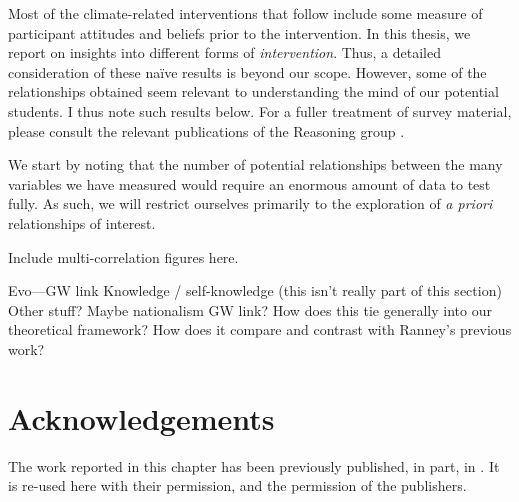 Most of the climate-related interventions that follow include some measure of
participant attitudes and beliefs prior to the intervention. In this thesis, we
report on insights into different forms of \emph{intervention}. Thus, a detailed
consideration of these na\"ive
results is beyond our scope. However, some of the relationships obtained seem
relevant to understanding the mind of our potential students. I thus note such
results below. For a fuller treatment of survey material, please consult the
relevant publications of the Reasoning group
\cite[notably,][]{cohen-thesis,ranney-etal-2012}.

We start by noting that the number of potential relationships between the many
variables we have measured would require an enormous amount of data to test
fully. As such, we will restrict ourselves primarily to the exploration of
\emph{a priori} relationships of interest.

Include multi-correlation figures here.

Evo—GW link
Knowledge / self-knowledge (this isn’t really part of this section)
Other stuff? Maybe nationalism GW link? How does this tie generally into our
theoretical framework? How does it compare and contrast with Ranney’s previous
work?

\section{Acknowledgements}

The work reported in this chapter has been previously published, in part, in
\textcite{ranney_why_inpress,and_others}. It is re-used here with their
permission, and the permission of the publishers.
